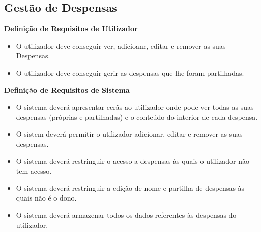 \documentclass[a4paper]{report}
\begin{document}
        \subsection{Gestão de Despensas}
            \textbf{Definição de Requisitos de Utilizador}
            \begin{itemize}
                \item O utilizador deve conseguir ver, adicioanr, 
                editar e remover as suas Despensas.
                \item O utilizador deve conseguir gerir as despensas que 
                lhe foram partilhadas.
            \end{itemize}
            \textbf{Definição de Requisitos de Sistema}
            \begin{itemize}
                \item O sistema deverá apresentar ecrãs ao utilizador onde
                pode ver todas as suas despensas (próprias e partilhadas) e
                o conteúdo do interior de cada despensa.
                \item O sistem deverá permitir o utilizador adicionar, editar e 
                remover as suas despensas.
                \item O sistema deverá restringuir o acesso a despensas às
                quais o utilizador não tem acesso.
                \item O sistema deverá restringuir a edição de nome e partilha
                de despensas às quais não é o dono.
                \item O sistema deverá armazenar todos os dados referentes às
                despensas do utilizador.
            \end{itemize}
\end{document}
